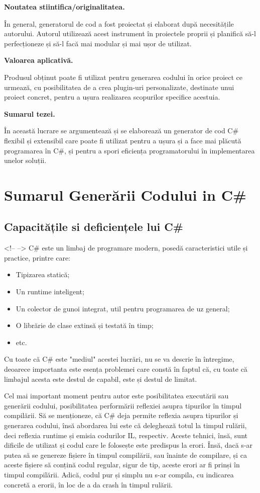\documentclass{report}
\begin{document}
\textbf{Noutatea stiintifica/originalitatea.}

În general, generatorul de cod a fost proiectat și elaborat după necesitățile autorului.
Autorul utilizează acest instrument în proiectele proprii și planifică să-l perfecționeze și să-l facă mai modular și mai ușor de utilizat.

\textbf{Valoarea aplicativă.}

Produsul obținut poate fi utilizat pentru generarea codului în orice proiect ce urmează,
cu posibilitatea de a crea plugin-uri personalizate, destinate unui proiect concret,
pentru a ușura realizarea scopurilor specifice acestuia.

\textbf{Sumarul tezei.}

În această lucrare se argumentează și se elaborează un generator de cod C# flexibil și extensibil care poate fi utilizat pentru a ușura și a face mai plăcută programarea în C#, și pentru a spori eficiența programatorului în implementarea unelor soluții.

\chapter{Sumarul Generării Codului in C\#}

\section{Capacitățile si deficiențele lui C\#}

<!--  -->
C# este un limbaj de programare modern, posedă caracteristici utile și practice, printre care:
\begin{itemize}
  \item Tipizarea statică;
  \item Un runtime inteligent;
  \item Un colector de gunoi integrat, util pentru programarea de uz general;
  \item O librărie de clase extinsă și testată în timp;
  \item etc.
\end{itemize}

Cu toate că C# este "mediul" acestei lucrări, nu se va descrie în întregime,
deoarece importanta este esența problemei care constă în faptul că, cu toate că limbajul acesta este destul de capabil, este și destul de limitat.

Cel mai important moment pentru autor este posibilitatea executării sau generării codului,
posibilitatea performării reflexiei asupra tipurilor în timpul compilării.
Să se menționeze, că C# deja permite reflexia asupra tipurilor și generarea codului, însă abordarea lui este că deleghează totul la timpul rulării, deci reflexia runtime și emisia codurilor IL, respectiv.
Aceste tehnici, însă, sunt dificile de utilizat și codul care le folosește este predispus la erori.
Însă, dacă s-ar putea să se genereze fișiere în timpul compilării, sau înainte de compilare, și ca aceste fișiere să conțină codul regular, sigur de tip, aceste erori ar fi prinși în timpul compilării.
Adică, codul pur și simplu nu s-ar compila, cu indicarea concretă a erorii, în loc de a da crash în timpul rulării.
\end{document}
